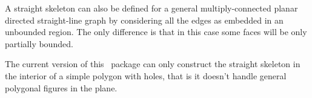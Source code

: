 A straight skeleton can also be defined for a general
multiply-connected planar directed straight-line graph \cite{aa-skfgpf-95} by considering
all the edges as embedded in an unbounded region. The only difference
is that in this case some faces will be only partially bounded.


The current version of this \cgal\ package can only construct the
straight skeleton in the interior of a simple polygon with holes, that is it
doesn't handle general polygonal figures in the plane.


